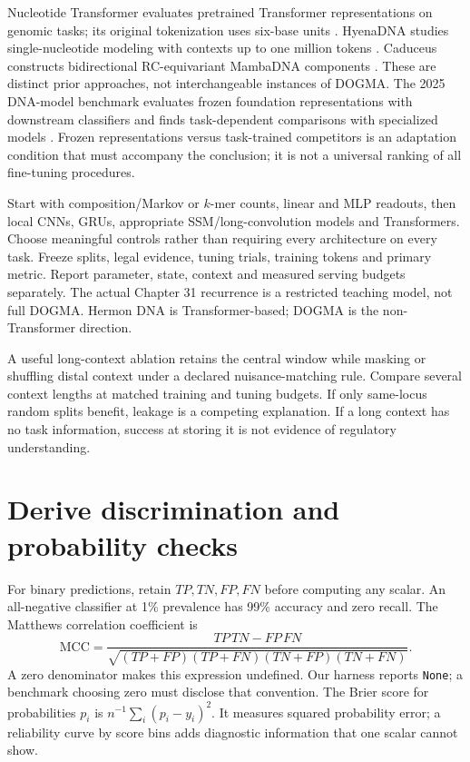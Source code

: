 Nucleotide Transformer evaluates pretrained Transformer representations on
genomic tasks; its original tokenization uses six-base units
\cite{evod48:nt}. HyenaDNA studies single-nucleotide modeling with contexts
up to one million tokens \cite{evod48:hyena}. Caduceus constructs
bidirectional RC-equivariant MambaDNA components \cite{evod48:caduceus}.
These are distinct prior approaches, not interchangeable instances of DOGMA.
The 2025 DNA-model benchmark evaluates frozen foundation representations
with downstream classifiers and finds task-dependent comparisons with
specialized models \cite{evod48:benchmark}. Frozen representations versus
task-trained competitors is an adaptation condition that must accompany
the conclusion; it is not a universal ranking of all fine-tuning procedures.

Start with composition/Markov or $k$-mer counts, linear and MLP readouts,
then local CNNs, GRUs, appropriate SSM/long-convolution models and Transformers.
Choose meaningful controls rather than requiring every architecture on every
task. Freeze splits, legal evidence, tuning trials, training tokens and primary
metric. Report parameter, state, context and measured serving budgets separately.
The actual Chapter 31 recurrence is a restricted teaching model, not full
DOGMA. Hermon DNA is Transformer-based; DOGMA is the non-Transformer direction.

A useful long-context ablation retains the central window while masking or
shuffling distal context under a declared nuisance-matching rule. Compare
several context lengths at matched training and tuning budgets. If only
same-locus random splits benefit, leakage is a competing explanation. If a
long context has no task information, success at storing it is not evidence
of regulatory understanding.

\section{Derive discrimination and probability checks}
For binary predictions, retain $TP,TN,FP,FN$ before computing any scalar.
An all-negative classifier at 1\% prevalence has 99\% accuracy and zero recall.
The Matthews correlation coefficient is
\[
\mathrm{MCC}=\frac{TP\,TN-FP\,FN}
{\sqrt{(TP+FP)(TP+FN)(TN+FP)(TN+FN)}}.
\]
A zero denominator makes this expression undefined. Our harness reports
\texttt{None}; a benchmark choosing zero must disclose that convention.
The Brier score for probabilities $p_i$ is $n^{-1}\sum_i(p_i-y_i)^2$.
It measures squared probability error; a reliability curve by score bins
adds diagnostic information that one scalar cannot show.

